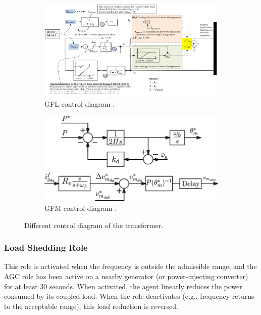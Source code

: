 \documentclass{article}
\begin{document}
\begin{figure}[htbp]
    \centering
    \begin{subfigure}[t]{0.90\textwidth}
        \centering
        \includegraphics[width=\linewidth]{plots/gfl_diagram.png}
        \caption{GFL control diagram \cite{diagram:gfl}.}
        \label{fig:control_gfl}
    \end{subfigure}
    \hfill
    \begin{subfigure}[t]{0.52\textwidth}
        \centering
        \includegraphics[width=\linewidth]{plots/gfm_diagram.png}
        \caption{GFM control diagram \cite{diagram:gfm}.}
        \label{fig:colmena_gfm}
    \end{subfigure}
    \caption{Different control diagram of the transformer.}
    \label{fig:gflgfm}
\end{figure}


\subsubsection*{Load Shedding Role}

This role is activated when the frequency is outside the admissible range, and the AGC role has been active on a nearby generator (or power-injecting converter) for at least 30 seconds. When activated, the agent linearly reduces the power consumed by its coupled load. When the role deactivates (e.g., frequency returns to the acceptable range), this load reduction is reversed.
\end{document}
